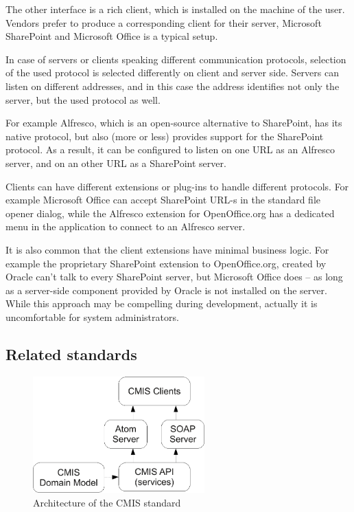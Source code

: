The other interface is a rich client, which is installed on the machine of the
user. Vendors prefer to produce a corresponding client for their server,
Microsoft SharePoint and Microsoft Office is a typical setup.

In case of servers or clients speaking different communication protocols,
selection of the used protocol is selected differently on client and server
side. Servers can listen on different addresses, and in this case the address
identifies not only the server, but the used protocol as well.

For example Alfresco\cite{alfresco}, which is an open-source alternative to
SharePoint, has its native protocol, but also (more or less) provides support
for the SharePoint protocol. As a result, it can be configured to listen on
one URL as an Alfresco server, and on an other URL as a SharePoint server.

Clients can have different extensions or plug-ins to handle different
protocols. For example Microsoft Office can accept SharePoint URL-s in the
standard file opener dialog, while the Alfresco extension for OpenOffice.org
has a dedicated menu in the application to connect to an Alfresco server.

It is also common that the client extensions have minimal business logic. For
example the proprietary SharePoint extension to OpenOffice.org, created by
Oracle can't talk to every SharePoint server, but Microsoft Office does -- as
long as a server-side component provided by Oracle is not installed on the
server. While this approach may be compelling during development, actually it
is uncomfortable for system administrators.

\subsection{Related standards}

\begin{figure}[H]
\centering
\includegraphics[width=250px,keepaspectratio]{cmis.pdf}
\caption{Architecture of the CMIS standard}
\label{fig:cmis}
\end{figure}

